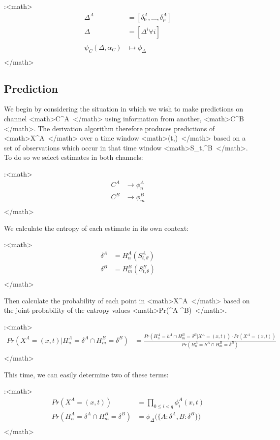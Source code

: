 \documentclass[11pt,twocolumn,titlepage]{article}
\begin{document}
:<math>
\begin{align}
\Delta^A &= [\delta_0^A,...,\delta_p^A] \\
\Delta &= [\Delta^i \forall i] \\
\\
\psi_C( \Delta , \alpha_C ) &\mapsto \phi_\Delta \\
\end{align}
</math>

\subsection{Prediction}
We begin by considering the situation in which we wish to make predictions on channel <math>C^A \,\!</math> using information from another, <math>C^B \,\!</math>.  The derivation algorithm therefore produces predictions of <math>X^A \,\!</math> over a time window <math>(t,\theta) \,\!</math> based on a set of observations which occur in that time window <math>S_{t,\theta}^B \,\!</math>.  To do so we select estimates in both channels:

:<math>
\begin{align}
C^A &\rightarrow \phi_n^A \\
C^B &\rightarrow \phi_m^B \\
\end{align}
</math>


We calculate the entropy of each estimate in its own context:

:<math>
\begin{align}
\delta^A &= H_n^A( S_{t,\theta}^A ) \\
\delta^B &= H_m^B( S_{t,\theta}^B ) \\
\end{align}
</math>


Then calculate the probability of each point in <math>X^A \,\!</math> based on the joint probability of the entropy values <math>Pr(\delta^A \cap \delta^B) \,\!</math>.

:<math>
\begin{align}
Pr( X^A = (x,t) | H_n^A = \delta^A \cap H_m^B = \delta^B ) &= \frac 
{ Pr( H_n^A = h^A \cap H_m^B = \delta^B | X^A = (x,t) ) \cdot Pr( X^A = (x,t) ) }
{ Pr( H_n^A = h^A \cap H_m^B = \delta^B ) } \\
\end{align}
</math>


This time, we can easily determine two of these terms:

:<math>
\begin{align}
Pr( X^A = (x,t) ) &= \prod_{0 \le i < q} \phi_i^A(x,t) \\
Pr( H_n^A = \delta^A \cap H_m^B = \delta^B ) &= \phi_\Delta \Big( \{ A: \delta^A, B: \delta^B \} \Big) \\
\end{align}
</math>
\end{document}
